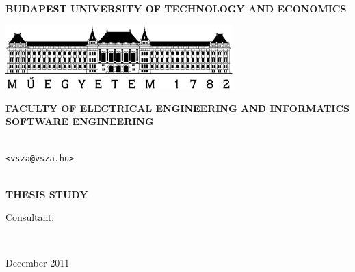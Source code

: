 \begin{center}

\textbf{BUDAPEST UNIVERSITY OF TECHNOLOGY AND ECONOMICS}

\medskip

\includegraphics[width=8.79cm]{images/bme.pdf}

\medskip

\textbf{FACULTY OF ELECTRICAL ENGINEERING AND INFORMATICS\\SOFTWARE ENGINEERING}

 \vspace{2cm}
 \Large\textbf{\cim}

 \vspace{6mm}
 \textbf{\nev} \\
 \texttt{<vsza@vsza.hu>} \\ \strut \\

 \Large\textbf{THESIS STUDY}

\end{center}

\vfill

Consultant:

\begin{center}
\konzulens\\ \konzbeoszt

\vspace{96pt}

December 2011
\end{center}

